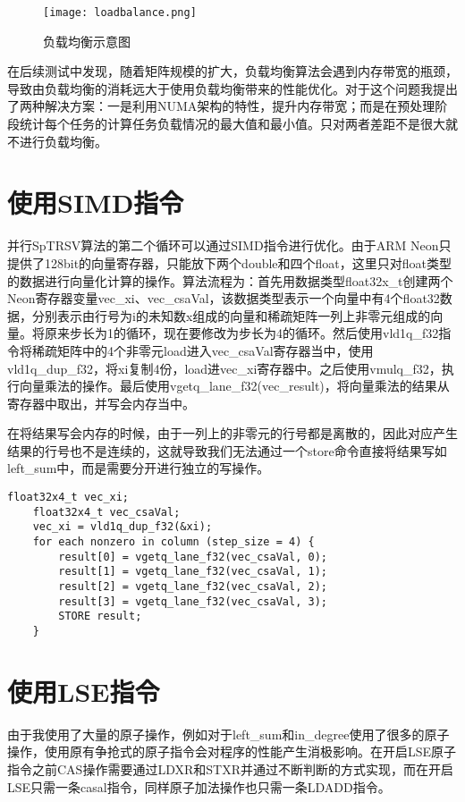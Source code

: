 \begin{figure}[htbp]
    \centering
    \texttt{[image: loadbalance.png]}
    \caption{负载均衡示意图}
    \label{负载均衡示意图}
\end{figure}

在后续测试中发现，随着矩阵规模的扩大，负载均衡算法会遇到内存带宽的瓶颈，导致由负载均衡的消耗远大于使用负载均衡带来的性能优化。对于这个问题我提出了两种解决方案：一是利用NUMA架构的特性，提升内存带宽；而是在预处理阶段统计每个任务的计算任务负载情况的最大值和最小值。只对两者差距不是很大就不进行负载均衡。


\section{使用SIMD指令}

并行SpTRSV算法的第二个循环可以通过SIMD指令进行优化。由于ARM Neon只提供了128bit的向量寄存器，只能放下两个double和四个float，这里只对float类型的数据进行向量化计算的操作。算法流程为：首先用数据类型float32x\_t创建两个Neon寄存器变量vec\_xi、vec\_csaVal，该数据类型表示一个向量中有4个float32数据，分别表示由行号为i的未知数x组成的向量和稀疏矩阵一列上非零元组成的向量。将原来步长为1的循环，现在要修改为步长为4的循环。然后使用vld1q\_f32指令将稀疏矩阵中的4个非零元load进入vec\_csaVal寄存器当中，使用vld1q\_dup\_f32，将xi复制4份，load进vec\_xi寄存器中。之后使用vmulq\_f32，执行向量乘法的操作。最后使用vgetq\_lane\_f32(vec\_result)，将向量乘法的结果从寄存器中取出，并写会内存当中。

在将结果写会内存的时候，由于一列上的非零元的行号都是离散的，因此对应产生结果的行号也不是连续的，这就导致我们无法通过一个store命令直接将结果写如left\_sum中，而是需要分开进行独立的写操作。

\begin{lstlisting}[caption={SIMD指令优化}]
    float32x4_t vec_xi;
    float32x4_t vec_csaVal;
    vec_xi = vld1q_dup_f32(&xi);
    for each nonzero in column (step_size = 4) {
        result[0] = vgetq_lane_f32(vec_csaVal, 0);
        result[1] = vgetq_lane_f32(vec_csaVal, 1);
        result[2] = vgetq_lane_f32(vec_csaVal, 2);
        result[3] = vgetq_lane_f32(vec_csaVal, 3);
        STORE result;
    }
\end{lstlisting}

\section{使用LSE指令}

由于我使用了大量的原子操作，例如对于left\_sum和in\_degree使用了很多的原子操作，使用原有争抢式的原子指令会对程序的性能产生消极影响。在开启LSE原子指令之前CAS操作需要通过LDXR和STXR并通过不断判断的方式实现，而在开启LSE只需一条casal指令，同样原子加法操作也只需一条LDADD指令。

